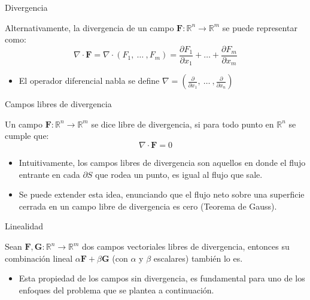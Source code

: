 \documentclass{beamer}
\begin{document}
\begin{frame}{Divergencia}
 
  \begin{definition}
    Alternativamente, la divergencia de un campo $\mathbf{F}:\mathbb{R}^n \rightarrow \mathbb{R}^m$ se puede representar
    como:
    $$ \nabla \cdot \mathbf{F} =
    \nabla \cdot (F_1,\ \ldots \ ,F_m)=
    \frac{\partial F_1}{\partial x_1} + \ldots + \frac{\partial F_m}{\partial x_m} $$
  \end{definition}

  \begin{itemize}
  \item {
    El operador diferencial nabla se define $\nabla=(\frac{\partial}{\partial x_1}, \ \ldots \ , \frac{\partial}{\partial x_n})$
  }

  \end{itemize}
\end{frame}


\begin{frame}{Campos libres de divergencia}
  \begin{definition}
    Un campo $\mathbf{F}:\mathbb{R}^n \rightarrow \mathbb{R}^m$ se dice libre de divergencia, si para todo punto
    en $\mathbb{R}^n$ se cumple que:
    $$ \nabla \cdot \mathbf{F} = 0$$  
  \end{definition}

  \begin{itemize}
  \item {
    Intuitivamente, los campos libres de divergencia son aquellos en donde el flujo entrante en cada $\partial S$ que rodea un punto, es igual al flujo que sale.
  }
  \item {
    Se puede extender esta idea, enunciando que el flujo neto sobre una superficie cerrada en un campo libre de divergencia es cero (Teorema de Gauss).
  }
  \end{itemize}
\end{frame}


\begin{frame}{Linealidad}
  \begin{theorem}
  Sean $\mathbf{F},\mathbf{G}:\mathbb{R}^n \rightarrow \mathbb{R}^m$  dos campos vectoriales libres de divergencia, entonces
  su combinación lineal $\alpha \mathbf{F} + \beta \mathbf{G}$ (con $\alpha \text{ y } \beta$ escalares) también lo es.
  \end{theorem}

  \begin{itemize}
  \item {
    Esta propiedad de los campos sin divergencia, es fundamental para uno de los enfoques del problema que se plantea a continuación.
  }
  \end{itemize}
\end{frame}
\end{document}
